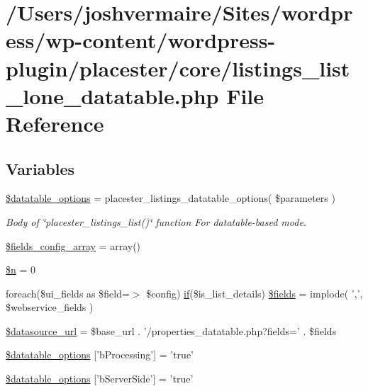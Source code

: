 \hypertarget{listings__list__lone__datatable_8php}{
\section{/Users/joshvermaire/Sites/wordpress/wp-\/content/wordpress-\/plugin/placester/core/listings\_\-list\_\-lone\_\-datatable.php File Reference}
\label{d5/d60/listings__list__lone__datatable_8php}
}
\subsection*{Variables}
\begin{DoxyCompactItemize}
\item 
\hyperlink{listings__list__lone__datatable_8php_ac481557faa1530c1ca3c5230aa250ca5}{\$datatable\_\-options} = placester\_\-listings\_\-datatable\_\-options( \$parameters )
\begin{DoxyCompactList}\small\item\em Body of \char`\"{}placester\_\-listings\_\-list()\char`\"{} function For datatable-\/based mode. \end{DoxyCompactList}\item 
\hyperlink{listings__list__lone__datatable_8php_aa926f565091fd4c2f4a25c17587a051d}{\$fields\_\-config\_\-array} = array()
\item 
\hyperlink{listings__list__lone__datatable_8php_aa5fae90470d460a65d5211ec08e6b05c}{\$n} = 0
\item 
foreach(\$ui\_\-fields as \$field=$>$ \$config) \hyperlink{listings__list__lone__divbased_8php_a0b49fff73af3a13232913ea65ca484d9}{if}(\$is\_\-list\_\-details) \hyperlink{listings__list__lone__datatable_8php_abb3e390c1079393569214c4be0c43edd}{\$fields} = implode( ',', \$webservice\_\-fields )
\item 
\hyperlink{listings__list__lone__datatable_8php_a62dfabd516087facc1d5da1ea1ed007f}{\$datasource\_\-url} = \$base\_\-url . '/properties\_\-datatable.php?fields=' . \$fields
\item 
\hyperlink{listings__list__lone__datatable_8php_a2e77568441b0796900b47cfdd320cf09}{\$datatable\_\-options} \mbox{[}'bProcessing'\mbox{]} = 'true'
\item 
\hyperlink{listings__list__lone__datatable_8php_a0d85a057189e4d001ef49bcca57298d6}{\$datatable\_\-options} \mbox{[}'bServerSide'\mbox{]} = 'true'

\end{DoxyCompactItemize}
